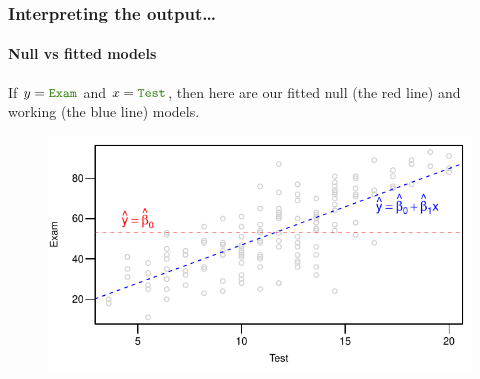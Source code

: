 \documentclass{beamer}\usepackage[]{graphicx}\usepackage[]{xcolor}
\begin{document}
\begin{frame}[fragile]
\frametitle{Interpreting the output\ldots}
\framesubtitle{Null vs fitted models}

If $y=\rcode{Exam}$ and $x=\rcode{Test}$, then here are our fitted null (the {\color{red} red} line) and working (the {\color{blue} blue} line) models.




\begin{figure}
  \centering
  \includegraphics{figure/RC-H02-029}
\end{figure}

\end{frame}
\end{document}
